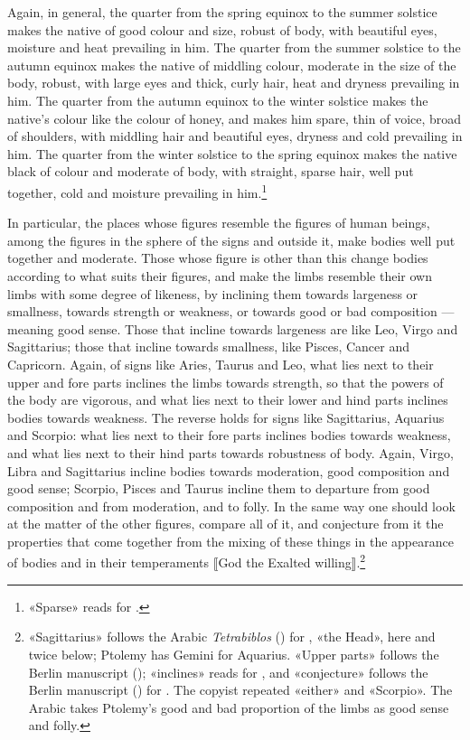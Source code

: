 \documentclass[11pt]{article}
\newcommand{\Fol}[1]{\marginpar{\footnotesize\color{gray}f.\,#1}}
\begin{document}
\par \Fol{52r}Again, in general, the quarter from the spring equinox to the summer solstice makes the native of good colour and size, robust of body, with beautiful eyes, moisture and heat prevailing in him. The quarter from the summer solstice to the autumn equinox makes the native of middling colour, moderate in the size of the body, robust, with large eyes and thick, curly hair, heat and dryness prevailing in him. The quarter from the autumn equinox to the winter solstice makes the native's colour like the colour of honey, and makes him spare, thin of voice, broad of shoulders, with middling hair and beautiful eyes, dryness and cold prevailing in him. The quarter from the winter solstice to the spring equinox makes the native black of colour and moderate of body, with straight, sparse hair, well put together, cold and moisture prevailing in him.\footnote{«Sparse» reads  for .}\par
\par In particular, the places whose figures resemble the figures of human beings, among the figures in the sphere of the signs and outside it, make bodies well put together and moderate. Those whose figure is other than this change bodies according to what suits their figures, and make the limbs resemble their own limbs with some degree of likeness, by inclining them towards largeness or smallness, towards strength or weakness, or towards good or bad composition — meaning good sense. Those that incline towards largeness are like Leo, Virgo and Sagittarius; those that incline towards smallness, like Pisces, Cancer and Capricorn. Again, of signs like Aries, Taurus and Leo, what lies next to their upper and fore parts inclines the limbs towards strength, so that the powers of the body are vigorous, and what lies next to their lower and hind parts inclines bodies towards weakness. The reverse holds for signs like Sagittarius, Aquarius and Scorpio: what lies next to their fore parts inclines bodies towards weakness, and what lies next to their hind parts towards robustness of body. Again, Virgo, Libra and Sagittarius incline bodies towards moderation, good composition and good sense; Scorpio, Pisces and Taurus incline them to departure from good composition and from moderation, and to folly. In the same way one should look at the matter of the other figures, compare all of it, and conjecture from it the properties that come together from the mixing of these things in the appearance of bodies and in their temperaments {\mdseries ⟦}God the Exalted willing{\mdseries ⟧}.\footnote{«Sagittarius» follows the Arabic \emph{Tetrabiblos} () for , «the Head», here and twice below; Ptolemy has Gemini for Aquarius. «Upper parts» follows the Berlin manuscript (); «inclines» reads  for , and «conjecture» follows the Berlin manuscript () for . The copyist repeated «either» and «Scorpio». The Arabic takes Ptolemy's good and bad proportion of the limbs as good sense and folly.}\par
\end{document}

